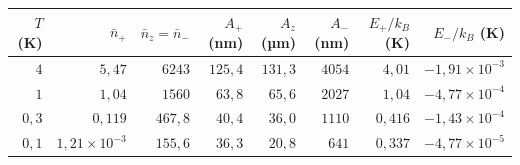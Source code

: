 \begin{tabular}{rrrrrrrr}
\toprule
$T$ (K) & $\bar n_+$ & $\bar n_z=\bar n_-$ & $A_+$ (nm) & $A_z$ (µm) & $A_-$ (nm) & $E_+/k_B$ (K) & $E_-/k_B$ (K) \\
\midrule
$4$ & $5{,}47$ & $6243$ & $125{,}4$ & $131{,}3$ & $4054$ & $4{,}01$ & $-1{,}91\times10^{-3}$ \\
$1$ & $1{,}04$ & $1560$ & $63{,}8$ & $65{,}6$ & $2027$ & $1{,}04$ & $-4{,}77\times10^{-4}$ \\
$0{,}3$ & $0{,}119$ & $467{,}8$ & $40{,}4$ & $36{,}0$ & $1110$ & $0{,}416$ & $-1{,}43\times10^{-4}$ \\
$0{,}1$ & $1{,}21\times10^{-3}$ & $155{,}6$ & $36{,}3$ & $20{,}8$ & $641$ & $0{,}337$ & $-4{,}77\times10^{-5}$ \\
\bottomrule
\end{tabular}
